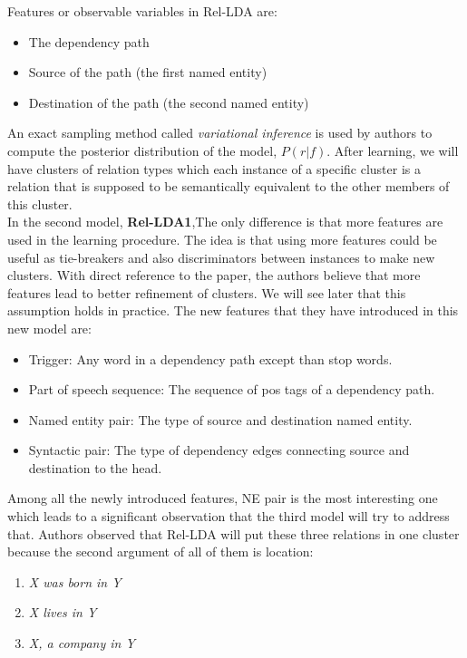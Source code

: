 \documentclass[12pt]{report}
\begin{document}
    Features or observable variables in Rel-LDA are:
    \begin{itemize}
      \item The dependency path
      \item Source of the path (the first named entity)
      \item Destination of the path (the second named entity)
    \end{itemize}
   	
   	An exact sampling method called \emph{variational inference} is used by authors to compute 
   	the posterior distribution of the model, $P(r|f)$.
   	After learning, we will have clusters of relation types which each instance of a specific cluster 
   	is a relation that is supposed to be semantically equivalent to the other members of this cluster.
   	\\
   	
   	In the second model, \textbf{Rel-LDA1},The only difference is that  more features are used in the learning procedure.
   	 The idea is that using more features could be useful as tie-breakers and also discriminators between instances
   	  to make new clusters. With direct reference to the paper, the authors believe that more features 
   	  lead to better refinement of clusters. We will see later that this assumption holds in practice.
   	   The new features that they have introduced in this new model are:
   	   \begin{itemize}
   	     \item Trigger: Any word in a dependency path except than stop words. 
   	     \item Part of speech sequence: The sequence of pos tags of a dependency path. 
   	     \item Named entity pair: The type of source and destination named entity.
   	     \item Syntactic pair: The type of dependency edges connecting source and destination to the head.
   	   \end{itemize}   
   
 Among all the newly introduced features, NE pair is the most interesting one which leads to a 
 significant observation that the third model will try to address that. Authors observed that 
 Rel-LDA will put these three relations in one cluster because the second argument of all of them is location:
 
 \begin{enumerate}
   \item \emph{ X was born in Y}
   \item \emph{ X lives in Y}
   \item \emph{ X, a company in Y}
 \end{enumerate}
 
\end{document}
